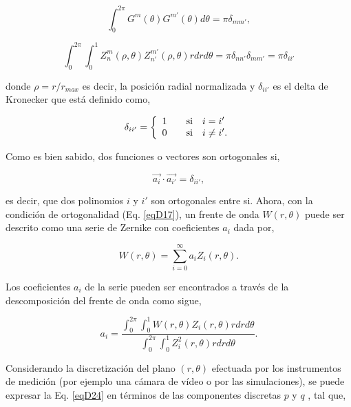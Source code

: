\begin{equation}
\label{eqD16}
	\int_0^{2\pi}G^m(\theta)G^{m'}(\theta) d\theta= \pi \delta_{mm'},
\end{equation}

\begin{equation}
\label{eqD17}
	\int_0^{2\pi} \int_0^1 Z_n^m (\rho,\theta) Z_{n'}^{m'} (\rho, \theta) rdrd\theta = \pi \delta_{nn'} \delta_{mm'} = \pi \delta_{ii'}
\end{equation}

donde $\rho = r/r_{max}$ es decir, la posición radial normalizada y $\delta_{ii'}$ es el delta de Kronecker que está definido como,

\begin{equation}
\label{eqD18}
	\delta_{ii'} = \left\{
	\begin{array}{l l}
		1 & \quad \text{si} \quad i = i'\\
		0 & \quad \text{si} \quad i \neq i'.
	\end{array} \right.
\end{equation}

Como es bien sabido, dos funciones o vectores son ortogonales si,

\begin{equation}
\label{eqD19}
	\vec{a_{i}} \cdot \vec{a_{i'}} = \delta_{ii'},
\end{equation}

es decir, que dos polinomios $i$ y $i'$ son ortogonales entre si. Ahora, con la condición de ortogonalidad (Eq. \ref{eqD17}), un frente de onda $W(r,\theta)$ puede ser descrito como una serie de Zernike con coeficientes $a_i$ dada por,

\begin{equation}
\label{eqD20}
	W(r,\theta) = \sum\limits_{i=0}^{\infty} a_i Z_i (r,\theta).
\end{equation}

Los coeficientes $a_i$ de la serie pueden ser encontrados a través de la descomposición del frente de onda como sigue,

\begin{equation}
\label{eqD21}
	a_i = \frac{\int_0^{2\pi} \int_0^1 W(r,\theta) Z_i(r,\theta) rdrd\theta}{\int_0^{2\pi} \int_0^1 Z_i^2(r,\theta) rdrd\theta}.
\end{equation}

Considerando la discretización del plano $(r,\theta)$ efectuada por los instrumentos de medición (por ejemplo una cámara de vídeo o por las simulaciones), se puede expresar la Eq. \ref{eqD24} en términos de las componentes discretas $p$ y $q$ \cite{Schmidt2010}, tal que,

